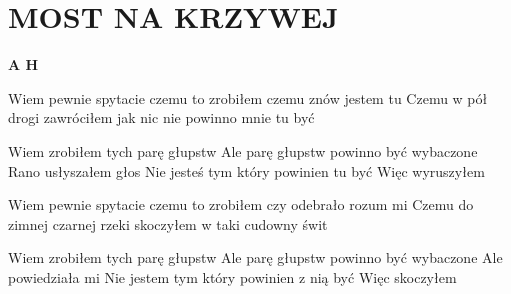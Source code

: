 \documentclass[../../../songbook.tex]{subfiles}
\begin{document}
\TabPositions{10cm} %
\section*{MOST NA KRZYWEJ}
{}
\vspace{0.5cm}
{\color{red}\textbf{A H} } \newline

Wiem pewnie spytacie czemu to zrobiłem czemu znów jestem tu	 \newline
Czemu w pół drogi zawróciłem jak nic nie powinno mnie tu być	\quad  {} \newline

\-\hspace{1cm} Wiem zrobiłem tych parę głupstw		 \newline
\-\hspace{1cm} Ale parę głupstw powinno być wybaczone	 \newline
\-\hspace{1cm} Rano usłyszałem głos				 \newline
\-\hspace{1cm} Nie jesteś tym który powinien tu być	 \newline
\-\hspace{1cm} Więc wyruszyłem				 \newline

Wiem pewnie spytacie czemu to zrobiłem czy odebrało rozum mi \newline
Czemu do zimnej czarnej rzeki skoczyłem w taki cudowny świt \newline

\-\hspace{1cm} Wiem zrobiłem tych parę głupstw		 \newline
\-\hspace{1cm} Ale parę głupstw powinno być wybaczone	 \newline
\-\hspace{1cm} Ale powiedziała mi				 \newline
\-\hspace{1cm} Nie jestem tym który powinien z nią być	 \newline
\-\hspace{1cm} Więc skoczyłem				 \newline
\end{document}

